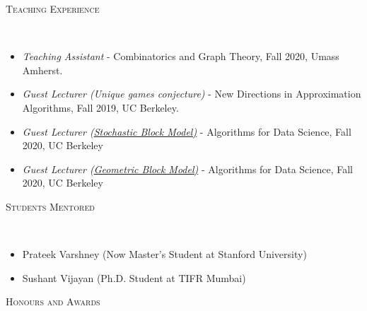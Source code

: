 \documentclass[9pt]{article}
\newenvironment{changemargin}[2]{%
  \begin{list}{}{%
    \setlength{\topsep}{0pt}%
    \setlength{\leftmargin}{0pt}%
    \setlength{\rightmargin}{#2}%
    \setlength{\listparindent}{\parindent}%
    \setlength{\itemindent}{\parindent}%
    \setlength{\parsep}{\parskip}%
  }%
  \item[]}{\end{list}
}
\newcommand{\lineover}{
	\begin{changemargin}{-0.05in}{-0.05in}
		\vspace*{-8pt}
		\hrulefill \\
		\vspace*{-2pt}
	\end{changemargin}
}
\newcommand{\header}[1]{
	\begin{changemargin}{-0.5in}{-0.5in}
		\scshape{#1}\\
  	\lineover
	\end{changemargin}
}
\begin{document}
%          


\header{Teaching Experience}

\begin{itemize}
\item \textit{Teaching Assistant} - Combinatorics and Graph Theory, Fall 2020, Umass Amherst.
\item \textit{Guest Lecturer (Unique games conjecture)} - New Directions in Approximation Algorithms, Fall 2019, UC Berkeley. 
\item \textit{Guest Lecturer (\href{https://drive.google.com/file/d/16HoOiB9J04bWamqGTN5cigeRlUoCoW27/view}{\color{blue}\textit{Stochastic Block Model)}}} - Algorithms for Data Science, Fall 2020, UC Berkeley
\item \textit{Guest Lecturer (\href{https://drive.google.com/file/d/1AFGdjGNsTQaaV9tcIV-N-O0nZkIjieqE/view}{\color{blue}\textit{Geometric Block Model)}}} - Algorithms for Data Science, Fall 2020, UC Berkeley
\end{itemize}


\header{Students Mentored}
\begin{itemize}
\item Prateek Varshney (Now Master's Student at Stanford University)
\item Sushant Vijayan (Ph.D. Student at TIFR Mumbai)
\end{itemize}


\header{Honours and Awards}
\end{document}

